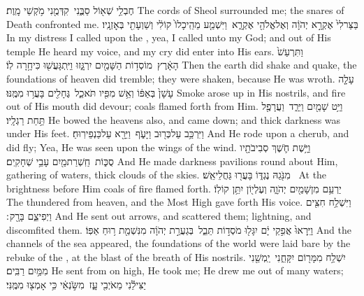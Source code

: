{חֶבְלֵ֥י שְׁא֖וֹל סַבֻּ֑נִי \setuma  קִדְּמֻ֖נִי מֹ֥קְשֵׁי מָֽוֶת׃}
{The cords of Sheol surrounded me; the snares of Death confronted me.}
{בַּצַּר\maqqaf לִי֙ אֶקְרָ֣א יְהֹוָ֔ה וְאֶל\maqqaf אֱלֹהַ֖י אֶקְרָ֑א \setuma  וַיִּשְׁמַ֤ע מֵהֵֽיכָלוֹ֙ קוֹלִ֔י וְשַׁוְעָתִ֖י בְּאׇזְנָֽיו׃}
{In my distress I called upon the \lord, yea, I called unto my God; and out of His temple He heard my voice, and my cry did enter into His ears.}
{ וַתִּרְעַשׁ֙ הָאָ֔רֶץ \setuma  מוֹסְד֥וֹת הַשָּׁמַ֖יִם יִרְגָּ֑זוּ וַיִּֽתְגָּעֲשׁ֖וּ כִּי\maqqaf חָ֥רָה לֽוֹ׃}
{Then the earth did shake and quake, the foundations of heaven did tremble; they were shaken, because He was wroth.}
{עָלָ֤ה עָשָׁן֙ בְּאַפּ֔וֹ וְאֵ֥שׁ מִפִּ֖יו תֹּאכֵ֑ל \setuma  גֶּחָלִ֖ים בָּעֲר֥וּ מִמֶּֽנּוּ׃}
{Smoke arose up in His nostrils, and fire out of His mouth did devour; coals flamed forth from Him.}
{וַיֵּ֥ט שָׁמַ֖יִם וַיֵּרַ֑ד \setuma  וַעֲרָפֶ֖ל תַּ֥חַת רַגְלָֽיו׃}
{He bowed the heavens also, and came down; and thick darkness was under His feet.}
{וַיִּרְכַּ֥ב עַל\maqqaf כְּר֖וּב וַיָּעֹ֑ף \setuma  וַיֵּרָ֖א עַל\maqqaf כַּנְפֵי\maqqaf רֽוּחַ׃}
{And He rode upon a cherub, and did fly; Yea, He was seen upon the wings of the wind.}
{וַיָּ֥שֶׁת חֹ֛שֶׁךְ סְבִיבֹתָ֖יו סֻכּ֑וֹת \setuma  חַֽשְׁרַת\maqqaf מַ֖יִם עָבֵ֥י שְׁחָקִֽים׃}
{And He made darkness pavilions round about Him, gathering of waters, thick clouds of the skies.}
{מִנֹּ֖גַהּ נֶגְדּ֑וֹ בָּעֲר֖וּ גַּחֲלֵי\maqqaf אֵֽשׁ׃ \setuma }
{At the brightness before Him coals of fire flamed forth.}
{יַרְעֵ֥ם מִן\maqqaf שָׁמַ֖יִם יְהֹוָ֑ה וְעֶלְי֖וֹן יִתֵּ֥ן קוֹלֽוֹ׃ \setuma }
{The \lord\space thundered from heaven, and the Most High gave forth His voice.}
{וַיִּשְׁלַ֥ח חִצִּ֖ים וַיְפִיצֵ֑ם בָּרָ֖ק ׃}
{And He sent out arrows, and scattered them; lightning, and discomfited them.}
{וַיֵּֽרָאוּ֙ אֲפִ֣קֵי יָ֔ם יִגָּל֖וּ מֹסְד֣וֹת תֵּבֵ֑ל \setuma  בְּגַעֲרַ֣ת יְהֹוָ֔ה מִנִּשְׁמַ֖ת ר֥וּחַ אַפּֽוֹ׃}
{And the channels of the sea appeared, the foundations of the world were laid bare by the rebuke of the \lord, at the blast of the breath of His nostrils.}
{יִשְׁלַ֥ח מִמָּר֖וֹם יִקָּחֵ֑נִי \setuma  יַֽמְשֵׁ֖נִי מִמַּ֥יִם רַבִּֽים׃}
{He sent from on high, He took me; He drew me out of many waters;}
{יַצִּילֵ֕נִי מֵאֹיְבִ֖י עָ֑ז \setuma  מִשֹּׂ֣נְאַ֔י כִּ֥י אָמְצ֖וּ מִמֶּֽנִּי׃}

